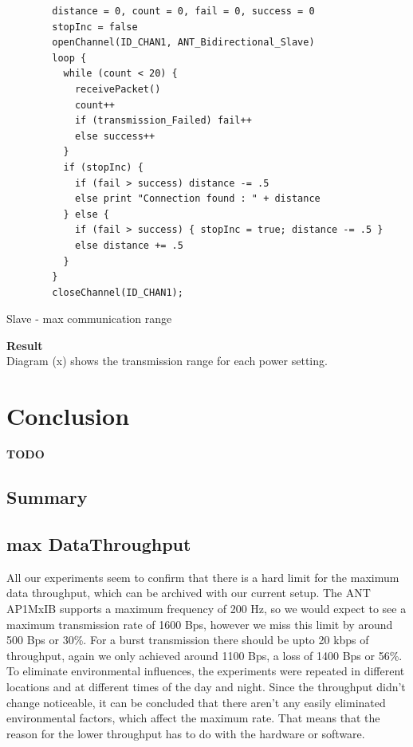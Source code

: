 \begin{description}
	\begin{code}
		\begin{verbatim}
		distance = 0, count = 0, fail = 0, success = 0
		stopInc = false
		openChannel(ID_CHAN1, ANT_Bidirectional_Slave)
		loop {
		  while (count < 20) {
		    receivePacket()
		    count++
		    if (transmission_Failed) fail++
		    else success++
		  }
		  if (stopInc) { 
		    if (fail > success) distance -= .5
		    else print "Connection found : " + distance
		  } else {
		    if (fail > success) { stopInc = true; distance -= .5 }
		    else distance += .5
		  }
		}
		closeChannel(ID_CHAN1);		
		\end{verbatim}
		\caption{Slave - max communication range}\label{lst:sExp6}
	\end{code}
	
	
	\item{\textbf{Result}} \hfill \\ Diagram (x) shows the transmission range for each power setting. 
\end{description}
\newpage


\chapter{Conclusion}
\textbf{TODO}
\section{Summary}

\section{max DataThroughput}
\label{sec:dataThrougput}

All our experiments seem to confirm that there is a hard limit for the maximum data throughput, which can be archived with our current setup. The ANT AP1MxIB supports a maximum frequency of 200 Hz, so we would expect to see a maximum transmission rate of 1600 Bps, however we miss this limit by around 500 Bps or 30\%. For a burst transmission there should be upto 20 kbps of throughput, again we only achieved around 1100 Bps, a loss of 1400 Bps or 56\%.\\
To eliminate environmental influences, the experiments were repeated in different locations and at different times of the day and night. Since the throughput didn't change noticeable, it can be concluded that there aren't any easily eliminated environmental factors, which affect the maximum rate. That means that the reason for the lower throughput has to do with the hardware or software. \\

